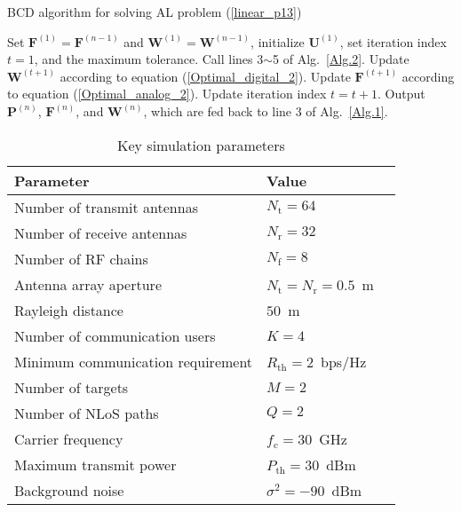 \documentclass[10pt,journal,twocolumn]{IEEEtran}
\begin{document}
\begin{algorithm}[t]
	\caption{BCD algorithm for solving AL problem (\ref{linear_p13})}
	\begin{algorithmic}[1]\label{Alg.4}
		\STATE Set $\mathbf{F}^{(1)}=\mathbf{F}^{(n-1)}$ and $\mathbf{W}^{(1)}=\mathbf{W}^{(n-1)}$,  initialize $\mathbf{U}^{(1)}$, set iteration index $t=1$,  and the maximum tolerance.
		\STATE Call lines 3$\sim$5 of Alg.~\ref{Alg.2}.
        \STATE Update $\mathbf{W}^{(t+1)}$ according to equation (\ref{Optimal_digital_2}).
        \STATE Update $\mathbf{F}^{(t+1)}$ according to equation (\ref{Optimal_analog_2}).
		\STATE Update iteration index $t=t+1$.
		\ENDWHILE	
		\STATE Output $\mathbf{P}^{(n)}$, $\mathbf{F}^{(n)}$, and $\mathbf{W}^{(n)}$, which are fed back to line 3 of Alg.~\ref{Alg.1}.
	\end{algorithmic}
\end{algorithm}


\begin{table}[t]
	\caption{Key simulation parameters}
        \vspace{-0.2cm}
	\begin{center}\label{Table II}
		\begin{tabular}{|l||l| p{13cm}}       
            \hline
			\bf{Parameter} & \bf{Value} \\
			\hline
			Number of transmit antennas& $N_{\text{t}}=64$\\
               \hline
			Number of receive antennas& $N_{\text{r}}=32$\\
            \hline
			Number of RF chains& $N_{\text{f}}=8$\\
            \hline
			Antenna array aperture& $N_{\text{t}}=N_{\text{r}}=0.5$~m\\
            \hline
			Rayleigh distance& $50$~m\\
            \hline
			Number of communication users& $K=4$\\
            \hline
			Minimum communication requirement & $R_{\text{th}}=2$~bps/Hz\\
            \hline
			Number of targets& $M=2$\\
            \hline
			Number of NLoS paths& $Q=2$\\
                \hline
			Carrier frequency & $f_{\text{c}}=30$~GHz\\
			\hline
                Maximum transmit power &$P_{\text{th}}=30$~dBm\\
                \hline
                Background noise &$\sigma^2=-90$~dBm\\
			\hline
		\end{tabular}
	\end{center}
\end{table}
\end{document}

